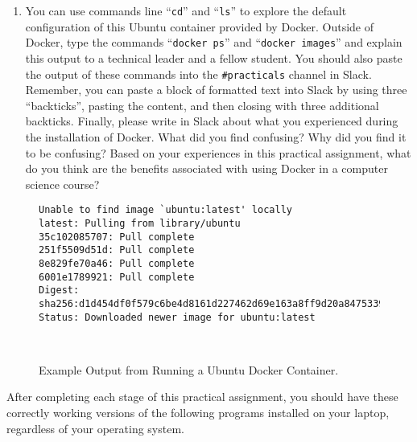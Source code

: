 \documentclass[11pt]{article}
\newcommand{\command}[1]{``\lstinline{#1}''}
\newcommand{\url}[1]{\lstinline{#1}}
\begin{document}
\begin{enumerate}
  \item You can use commands line \command{cd} and \command{ls} to explore the
    default configuration of this Ubuntu container provided by Docker. Outside
    of Docker, type the commands \command{docker ps} and \command{docker images}
    and explain this output to a technical leader and a fellow student. You
    should also paste the output of these commands into the \url{#practicals}
    channel in Slack. Remember, you can paste a block of formatted text into
    Slack by using three ``backticks'', pasting the content, and then closing
    with three additional backticks. Finally, please write in Slack about what
    you experienced during the installation of Docker. What did you find
    confusing? Why did you find it to be confusing? Based on your experiences in
    this practical assignment, what do you think are the benefits associated
    with using Docker in a computer science course?

\end{enumerate}


\begin{figure}

\begin{verbatim}
Unable to find image `ubuntu:latest' locally
latest: Pulling from library/ubuntu
35c102085707: Pull complete
251f5509d51d: Pull complete
8e829fe70a46: Pull complete
6001e1789921: Pull complete
Digest: sha256:d1d454df0f579c6be4d8161d227462d69e163a8ff9d20a847533989cf0c94d90
Status: Downloaded newer image for ubuntu:latest
\end{verbatim}

\vspace*{-.25in}
\caption{Example Output from Running a Ubuntu Docker Container.}~\label{fig:ubuntu}
\vspace*{-.25in}
\end{figure}

\vspace*{-.05in}

After completing each stage of this practical assignment, you should have these
correctly working versions of the following programs installed on your laptop,
regardless of your operating system.

\vspace*{-.05in}
\end{document}
